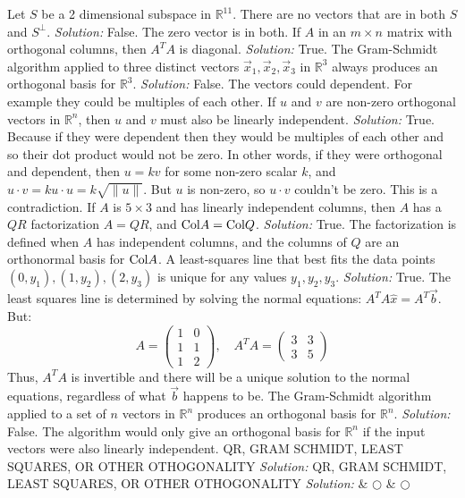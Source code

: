\fi     
\ifnum {}
    Let $S$ be a 2 dimensional subspace in $\mathbb R^{11}$.  There are no vectors that are in both $S$ and $S^\perp$. 
    \ifnum {} {\color{DarkBlue} \textit{Solution:  }  False. The zero vector is in both. } \fi
\fi     
\ifnum {}
   If $A$ in an $m\times n$ matrix with orthogonal columns, then $A^TA$ is diagonal. 
    \ifnum {} {\color{DarkBlue} \textit{Solution:  } True.   } \fi
\fi     
\ifnum {} 
     The Gram-Schmidt algorithm applied to three distinct vectors  
     $\vec x_1,\vec  x_2,\vec  x_3$  in $\mathbb R^3$ always produces an orthogonal basis 
     for $\mathbb R^3$. 
    \ifnum {} {\color{DarkBlue} \textit{Solution:  } False. 
    The vectors could dependent. For example they could be multiples of each other.}  \fi
\fi     
\ifnum {}
    If $u$ and $ v$ are non-zero orthogonal vectors in $\mathbb R^n$, then $u$ and $v$ must also be linearly independent. 
    \ifnum {} {\color{DarkBlue} \textit{Solution:  } True. Because if they were dependent then they would be multiples of each other and so their dot product would not be zero. In other words, if they were orthogonal and dependent, then $u = kv$ for some non-zero scalar $k$, and $u\cdot v = k u\cdot u = k\sqrt{\| u \|}$. But $u$ is non-zero, so $u\cdot v$ couldn't be zero. This is a contradiction. } \fi
\fi     
\ifnum {}
    If $A$ is $5\times 3$ and has linearly independent columns, then $A$ has a $QR$ factorization $A=QR$, and $\text{Col} A = \text{Col} Q$.
    \ifnum {} {\color{DarkBlue} \textit{Solution:  } True. The factorization is defined when $A$ has independent columns, and the columns of $Q$ are an orthonormal basis for $\text{Col} A$. } \fi
\fi   
\ifnum {}
    A least-squares line that best fits the data points $ (0, y_1), (1, y_2), (2,y_3)$ is unique for any values $y_1,y_2,y_3$.
    \ifnum {} {\color{DarkBlue} \textit{Solution:  } True. The least squares line is determined by solving the normal equations: 
    $A^TA \hat x = A^T \vec b$. But: 
    $$A = \begin{pmatrix} 1 & 0 \\ 1 & 1 \\ 1 & 2 \end{pmatrix}, \quad A^TA = \begin{pmatrix} 3 & 3 \\ 3 & 5 \end{pmatrix} $$
    Thus, $A^TA$ is invertible and there will be a unique solution to the normal equations, regardless of what $\vec b$ happens to be.  } \fi
\fi   
\ifnum {}
    The Gram-Schmidt algorithm applied to a set of $n$ vectors in $\mathbb R^n$ produces an orthogonal basis for $\mathbb{R}^n$.
    \ifnum {} {\color{DarkBlue} \textit{Solution:  } False. The algorithm would only give an orthogonal basis for $\mathbb R^n$ if the input vectors were also linearly independent. } \fi
\fi   
\ifnum {}
    QR, GRAM SCHMIDT, LEAST SQUARES, OR OTHER OTHOGONALITY 
    \ifnum {} {\color{DarkBlue} \textit{Solution:  }  } \fi
\fi   
\ifnum {}
    QR, GRAM SCHMIDT, LEAST SQUARES, OR OTHER OTHOGONALITY 
    \ifnum {} {\color{DarkBlue} \textit{Solution:  }  } \fi
\fi   
& $\bigcirc$  & $\bigcirc$ \\   